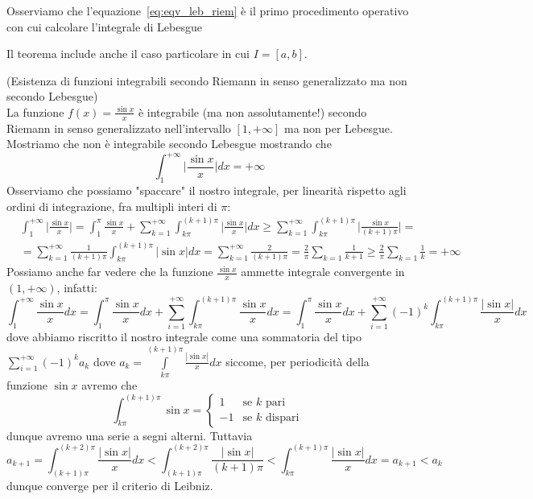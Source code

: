 \begin{remark}
	Osserviamo che l'equazione~\ref{eq:eqv_leb_riem} è il primo procedimento operativo con cui calcolare l'integrale di Lebesgue
\end{remark}
\begin{remark}
	Il teorema include anche il caso particolare in cui $I=[a,b]$.
\end{remark}
\begin{remark}(Esistenza di funzioni integrabili secondo Riemann in senso generalizzato ma non secondo Lebesgue) \\
	La funzione $f(x) = \frac{\sin{x}}{x}$ è integrabile (ma non assolutamente!) secondo Riemann in senso generalizzato nell'intervallo $[1, +\infty]$ ma non per Lebesgue. \\
	Mostriamo che non è integrabile secondo Lebesgue mostrando che
	$$
	\int_1^{+\infty} \Big| \frac{\sin{x}}{x} \Big|dx = +\infty
	$$
	Osserviamo che possiamo "spaccare" il nostro integrale, per linearità rispetto agli ordini di integrazione, fra multipli interi di $\pi$:
	\begin{align*}
	&\int_1^{+\infty} \Big| \frac{\sin{x}}{x} \Big| = \int_1^{\pi} \frac{\sin{x}}{x} + \sum_{k=1}^{+\infty} \int_{k\pi}^{(k+1)\pi} \Big|\frac{\sin{x}}{x} \Big|dx \geq \sum_{k=1}^{+\infty} \int_{k\pi}^{(k+1)\pi} \Big|\frac{\sin{x}}{(k+1)\pi} \Big| = \\
	&=\sum_{k=1}^{+\infty} \frac{1}{(k+1)\pi}\int_{k\pi}^{(k+1)\pi} |\sin{x}|dx = \sum_{k=1}^{+\infty} \frac{2}{(k+1)\pi} = \frac{2}{\pi}\sum_{k=1} \frac{1}{k+1} \geq \frac{2}{\pi} \sum_{k=1} \frac{1}{k} = +\infty
	\end{align*}
	Possiamo anche far vedere che la funzione $\frac{\sin{x}}{x}$ ammette integrale convergente in $(1, +\infty)$, infatti:
	$$
	\int_1^{+\infty} \frac{\sin{x}}{x}dx = \int_1^\pi \frac{\sin{x}}{x}dx + \sum_{i=1}^{+\infty} \int_{k\pi}^{(k+1)\pi} \frac{\sin{x}}{x}dx = \int_1^{\pi} \frac{\sin{x}}{x}dx + \sum_{i=1}^{+\infty} (-1)^k \int_{k\pi}^{(k+1)\pi} \frac{|\sin{x}|}{x}dx
	$$
	dove abbiamo riscritto il nostro integrale come una sommatoria del tipo $\sum\limits_{i=1}^{+\infty} (-1)^k a_k$ dove $a_k = \int\limits_{k\pi}^{(k+1)\pi} \frac{|\sin{x}|}{x}dx$ siccome, per periodicità della funzione $\sin{x}$ avremo che
	\begin{equation*}
		\int_{k\pi}^{(k+1)\pi} \sin{x} = \begin{cases}
			1 & \text{se } k \text{ pari } \\
			-1 & \text{se } k \text{ dispari }
		\end{cases}
	\end{equation*}
	dunque avremo una serie a segni alterni. Tuttavia
	$$
	a_{k+1} = \int_{(k+1)\pi}^{(k+2)\pi} \frac{|\sin{x}|}{x} dx < \int_{(k+1)\pi}^{(k+2)\pi} \frac{|\sin{x}|}{(k+1)\pi} < \int_{k\pi}^{(k+1)\pi} \frac{|\sin{x}|}{x} dx = a_{k+1} < a_k
	$$
	dunque converge per il criterio di Leibniz.
\end{remark}
